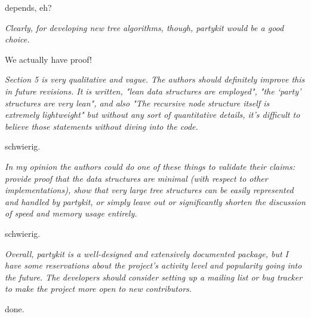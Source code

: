 \documentclass{article}
\begin{document}
depends, eh?

\textit{
Clearly, for developing new tree algorithms, though, partykit would be a good choice.}

We actually have proof!

\textit{
Section 5 is very qualitative and vague.  The authors should definitely
improve this in future revisions.  It is written, "lean data structures are
employed", "the `party' structures are very lean", and also "The recursive
node structure itself is extremely lightweight" but without any sort of
quantitative details, it's difficult to believe those statements without
diving into the code.}

schwierig.

\textit{
In my opinion the authors could do one of these things to validate their
claims: provide proof that the data structures are minimal (with respect to
other implementations), show that very large tree structures can be easily
represented and handled by partykit, or simply leave out or significantly
shorten the discussion of speed and memory usage entirely.}

schwierig.

\textit{
Overall, partykit is a well-designed and extensively documented package, but
I have some reservations about the project's activity level and popularity
going into the future.  The developers should consider setting up a mailing
list or bug tracker to make the project more open to new contributors.}

done.



\end{document}
